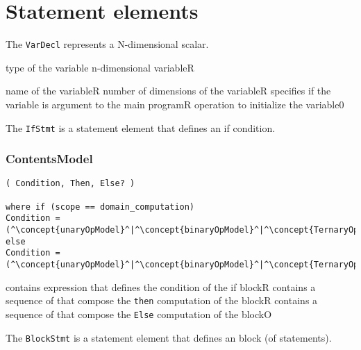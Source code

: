 \section{Statement elements}


The {\tt VarDecl} represents a N-dimensional scalar.

\begin{HIRChildElements}
	{type of the variable n-dimensional variable}{R}
\end{HIRChildElements}

\begin{HIRAttributes}
	{name of the variable}{R}
	{number of dimensions of the variable}{R}
    {specifies if the variable is argument to the main program}{R}
	{operation to initialize the variable}{0}
\end{HIRAttributes}

The {\tt IfStmt} is a statement element that defines an if condition.

\subsubsection*{ContentsModel}{}

\begin{lstlisting}[style=default,frame=none]
( Condition, Then, Else? )

where if (scope == domain_computation)
Condition = (^\concept{unaryOpModel}^|^\concept{binaryOpModel}^|^\concept{TernaryOp}^|^\concept{FieldAccess}^|^\concept{VarAccess}^|^\concept{Literal}^)
else
Condition = (^\concept{unaryOpModel}^|^\concept{binaryOpModel}^|^\concept{TernaryOp}^|^\concept{VarAccess}^|^\concept{Literal}^)
\end{lstlisting}

\begin{HIRChildElements}
	{contains expression that defines the condition of the if block}{R}
	{contains a sequence of  that compose the {\tt then} 
	 computation of the block}{R}
	{contains a sequence of  that compose the {\tt Else} 
	 computation of the block}{O}
\end{HIRChildElements}

The {\tt BlockStmt} is a statement element that defines an block (of statements).

